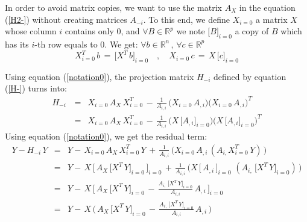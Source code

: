 In order to avoid matrix copies, we want to use the matrix $A_X$ in the equation (\ref{H2-}) without creating matrices $A_{-i }$.
To this end, we define $X_{i=0}$ a matrix $X$ whose column $i$ contains only $0$, and $\forall B \in \mathbb{R}^p$ we note $\big[B\big]_{i=0}$ a copy of $B$ which has its $i$-th row equals to $0$.
We get: $\forall b \in \mathbb{R}^n\,,\, \forall c \in \mathbb{R}^p $
 \begin{equation}
\label{notation0}
X_{i=0}^T\,b \,=\,\big[X^T\,b\big]_{i=0} \quad,\quad X_{i=0}\,c \,=\,X\,\big[c\big]_{i=0}
 \end{equation}


 Using equation (\ref{notation0}), the projection matrix $H_{-i}$ defined by equation (\ref{H-}) turns into:
 \begin{eqnarray}
H_{-i}\, & = & X_{i=0}\,A_X\,X_{i=0}^T \,-\,\frac {1}{A_{i,i}}\,  \big(X_{i=0}\,A_{,i}\big) \big(X_{i=0}\,A_{,i}\big)^T   \\
& = & X_{i=0}\,A_X\,X_{i=0}^T \,-\,\frac {1}{A_{i,i}}\,  \big(X\,\big[A_{,i}\big]_{i=0}  \big) \big(X\,\big[A_{,i}\big]_{i=0} \big)^T
\end{eqnarray}
 Using equation (\ref{notation0}), we get the residual term:
 \begin{eqnarray}
Y-H_{-i}\,Y & = &Y- \,X_{i=0}\,A_X\,X_{i=0}^T\,Y \,+\,\frac {1}{A_{i,i}}\,  \big(X_{i=0}\,A_{,i}\,(A_{i,} X_{i=0}^T\,Y)\,\big)   \\
 & = & Y-\,X\,\big[\,A_X\,\big[X^T\,Y\big]_{i=0}\,\big]_{i=0} \,+\,\frac {1}{A_{i,i}}\,  \big( X\,\big[\,A_{,i}\,\big]_{i=0}\,\,(A_{i,} \,\big[X^T\,Y\big]_{i=0})\,\big)   \\
 & = & Y-\,X\,\big[\,A_X\,\big[X^T\,Y\big]_{i=0}\, -\,\frac {A_{i,} \,\big[X^T\,Y\big]_{i=0}}{A_{i,i}}\,A_{,i}\,      \big]_{i=0} \\
\label{defH-Y}
 & = & Y- \,X\,\big(\,A_X\,\big[X^T\,Y\big]_{i=0}\, -\,\frac {A_{i,} \,\big[X^T\,Y\big]_{i=0}}{A_{i,i}}\,A_{,i}\,\big)
\end{eqnarray}



